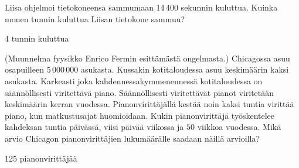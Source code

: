 \begin{tehtavasivu}
\begin{tehtava}
Liisa ohjelmoi tietokoneensa sammumaan 14\,400 sekunnin kuluttua. Kuinka monen tunnin kuluttua Liisan tietokone sammuu?
\begin{vastaus}
4 tunnin kuluttua
\end{vastaus}
\end{tehtava}

\begin{tehtava}
(Muunnelma fyysikko Enrico Fermin esittämästä ongelmasta.) Chicagossa asuu osapuilleen
$5\,000\,000$ asukasta. Kussakin kotitaloudessa asuu keskimäärin kaksi asukasta.
Karkeasti joka kahdennessakymmenennessä kotitaloudessa on säännöllisesti viritettävä piano.
Säännöllisesti viritettävät pianot viritetään keskimäärin kerran vuodessa.
Pianonvirittäjällä kestää noin kaksi tuntia virittää piano, kun matkustusajat huomioidaan.
Kukin pianonvirittäjä työskentelee kahdeksan tuntia päivässä, viisi päivää viikossa
ja $50$ viikkoa vuodessa. Mikä arvio Chicagon pianonvirittäjien lukumäärälle saadaan näillä
arvioilla?
\begin{vastaus}
125 pianonvirittäjää
\end{vastaus}
\end{tehtava}

\end{tehtavasivu}
